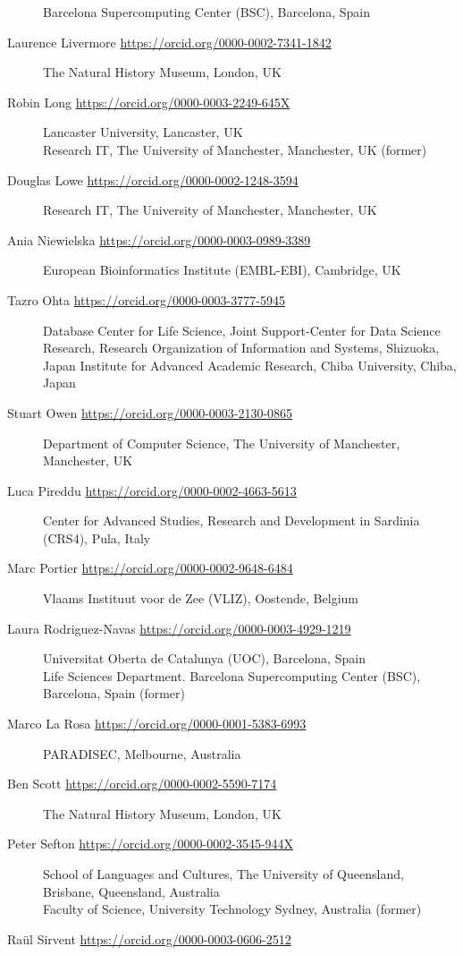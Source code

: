 \begin{flushleft}
\begin{description}
Barcelona Supercomputing Center (BSC), Barcelona, Spain
\item[Laurence Livermore \url{https://orcid.org/0000-0002-7341-1842}]
The Natural History Museum, London, UK
\item[Robin Long \url{https://orcid.org/0000-0003-2249-645X}]
Lancaster University, Lancaster, UK\\
Research IT, The University of Manchester, Manchester, UK (former)
\item[Douglas Lowe \url{https://orcid.org/0000-0002-1248-3594}]
Research IT, The University of Manchester, Manchester, UK
\item[Ania Niewielska \url{https://orcid.org/0000-0003-0989-3389}]
European Bioinformatics Institute (EMBL-EBI), Cambridge, UK
\item[Tazro Ohta \url{https://orcid.org/0000-0003-3777-5945}]
Database Center for Life Science, Joint Support-Center for Data Science Research, Research Organization of Information and Systems, Shizuoka, Japan
Institute for Advanced Academic Research, Chiba University, Chiba, Japan
\item[Stuart Owen \url{https://orcid.org/0000-0003-2130-0865}]
Department of Computer Science, The University of Manchester,
Manchester, UK
\item[Luca Pireddu \url{https://orcid.org/0000-0002-4663-5613}]
Center for Advanced Studies, Research and Development in Sardinia
(CRS4), Pula, Italy
\item[Marc Portier \url{https://orcid.org/0000-0002-9648-6484}]
Vlaams Instituut voor de Zee (VLIZ), Oostende, Belgium
\item[Laura Rodriguez-Navas \url{https://orcid.org/0000-0003-4929-1219}]
Universitat Oberta de Catalunya (UOC), Barcelona, Spain\\
Life Sciences Department. Barcelona Supercomputing Center (BSC),
Barcelona, Spain (former)
\item[Marco La Rosa \url{https://orcid.org/0000-0001-5383-6993}]
PARADISEC, Melbourne, Australia
\item[Ben Scott \url{https://orcid.org/0000-0002-5590-7174}]
The Natural History Museum, London, UK
\item[Peter Sefton \url{https://orcid.org/0000-0002-3545-944X}]
School of Languages and Cultures, The
University of Queensland, Brisbane, Queensland, Australia\\
Faculty of Science, University Technology Sydney, Australia (former)
\item[Raül Sirvent \url{https://orcid.org/0000-0003-0606-2512}]

\end{description}
\end{flushleft}
